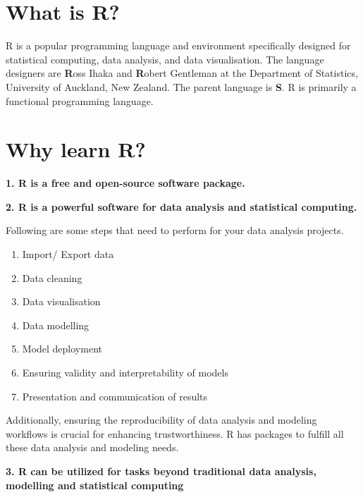 \documentclass[
  letterpaper,
  DIV=11,
  numbers=noendperiod]{scrreprt}
\providecommand{\tightlist}{%
  \setlength{\itemsep}{0pt}\setlength{\parskip}{0pt}}\usepackage{longtable,booktabs,array}
\begin{document}
\hypertarget{what-is-r}{%
\section{What is R?}\label{what-is-r}}

R is a popular programming language and environment specifically
designed for statistical computing, data analysis, and data
visualisation. The language designers are \textbf{R}oss Ihaka and
\textbf{R}obert Gentleman at the Department of Statistics, University of
Auckland, New Zealand. The parent language is \textbf{S}. R is primarily
a functional programming language.

\hypertarget{why-learn-r}{%
\section{Why learn R?}\label{why-learn-r}}

\textbf{1. R is a free and open-source software package.}

\textbf{2. R is a powerful software for data analysis and statistical
computing.}

Following are some steps that need to perform for your data analysis
projects.

\begin{enumerate}
\def\labelenumi{\arabic{enumi}.}
\tightlist
\item
  Import/ Export data
\item
  Data cleaning
\item
  Data visualisation
\item
  Data modelling
\item
  Model deployment
\item
  Ensuring validity and interpretability of models
\item
  Presentation and communication of results
\end{enumerate}

Additionally, ensuring the reproducibility of data analysis and modeling
workflows is crucial for enhancing trustworthiness. R has packages to
fulfill all these data analysis and modeling needs.

\textbf{3. R can be utilized for tasks beyond traditional data analysis,
modelling and statistical computing}
\end{document}
